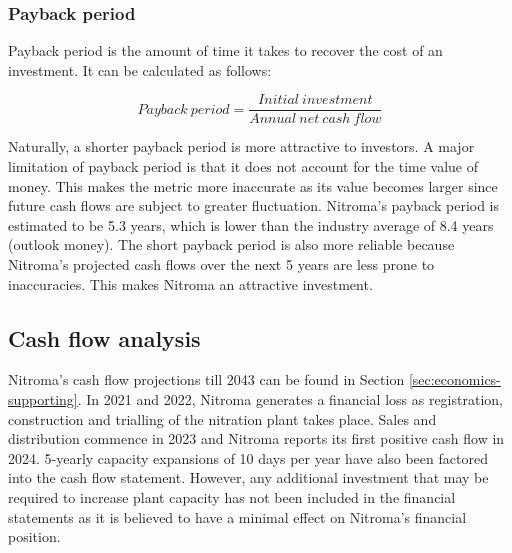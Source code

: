

\subsubsection{Payback period}
\label{sec:pby}
Payback period is the amount of time it takes to recover the cost of an investment. It can be calculated as follows:

\begin{equation}
\label{eqn:payback}
    Payback\:period = \frac{Initial\:investment}{Annual\:net\:cash\:flow}
\end{equation}

Naturally, a shorter payback period is more attractive to investors. A major limitation of payback period is that it does not account for the time value of money. This makes the metric more inaccurate as its value becomes larger since future cash flows are subject to greater fluctuation. Nitroma’s payback period is estimated to be 5.3 years, which is lower than the industry average of 8.4 years (outlook money).  The short payback period is also more reliable because Nitroma’s projected cash flows over the next 5 years are less prone to inaccuracies. This makes Nitroma an attractive investment. 


\subsection{Cash flow analysis}
\label{sec:cash-flows}
Nitroma’s cash flow projections till 2043 can be found in Section \ref{sec:economics-supporting}. In 2021 and 2022, Nitroma generates a financial loss as registration, construction and trialling of the nitration plant takes place. Sales and distribution commence in 2023 and Nitroma reports its first positive cash flow in 2024. 5-yearly capacity expansions of 10 days per year have also been factored into the cash flow statement. However, any additional investment that may be required to increase plant capacity has not been included in the financial statements as it is believed to have a minimal effect on Nitroma’s financial position.

